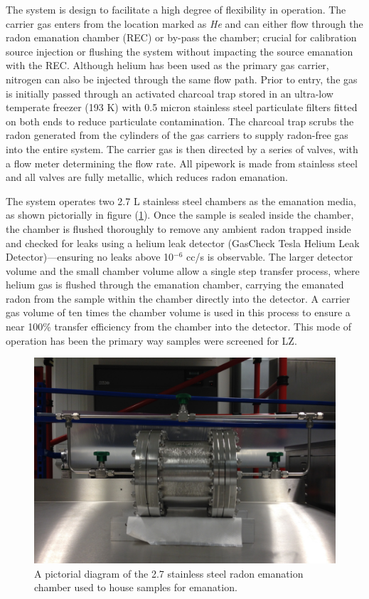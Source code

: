 The system is design to facilitate a high degree of flexibility in operation. The carrier gas enters from the location marked as \textit{He} and can either flow through the radon emanation chamber (REC) or by-pass the chamber; crucial for calibration source injection or flushing the system without impacting the source emanation with the REC. Although helium has been used as the primary gas carrier, nitrogen can also be injected through the same flow path. Prior to entry, the gas is initially passed through an activated charcoal trap stored in an ultra-low temperate freezer (193 K) with 0.5 micron stainless steel particulate filters fitted on both ends to reduce particulate contamination. The charcoal trap scrubs the radon generated from the cylinders of the gas carriers to supply radon-free gas into the entire system. The carrier gas is then directed by a series of valves, with a flow meter determining the flow rate. All pipework is made from stainless steel and all valves are fully metallic, which reduces radon emanation.

The system operates two 2.7 L stainless steel chambers as the emanation media, as shown pictorially in figure (\ref{fig:detector_chamber}). Once the sample is sealed inside the chamber, the chamber is flushed thoroughly to remove any ambient radon trapped inside and checked for leaks using a helium leak detector (GasCheck Tesla Helium Leak Detector)---ensuring no leaks above 10$^{−6}$ cc/s is observable. The larger detector volume and the small chamber volume allow a single step transfer process, where helium gas is flushed through the emanation chamber, carrying the emanated radon from the sample within the chamber directly into the detector. A carrier gas volume of ten times the chamber volume is used in this process to ensure a near 100\% transfer efficiency from the chamber into the detector. This mode of operation has been the primary way samples were screened for LZ.
%
\begin{figure}[]
    \centering
    \includegraphics[scale=0.4]{Chapter_4/Figures/radon_system_chamber.png}
    \caption[A pictorial diagram of the 2.7 stainless steel radon emanation chamber used to house samples for emanation.]
    {A pictorial diagram of the 2.7 stainless steel radon emanation chamber used to house samples for emanation.}
    \label{fig:detector_chamber}
\end{figure}
%

